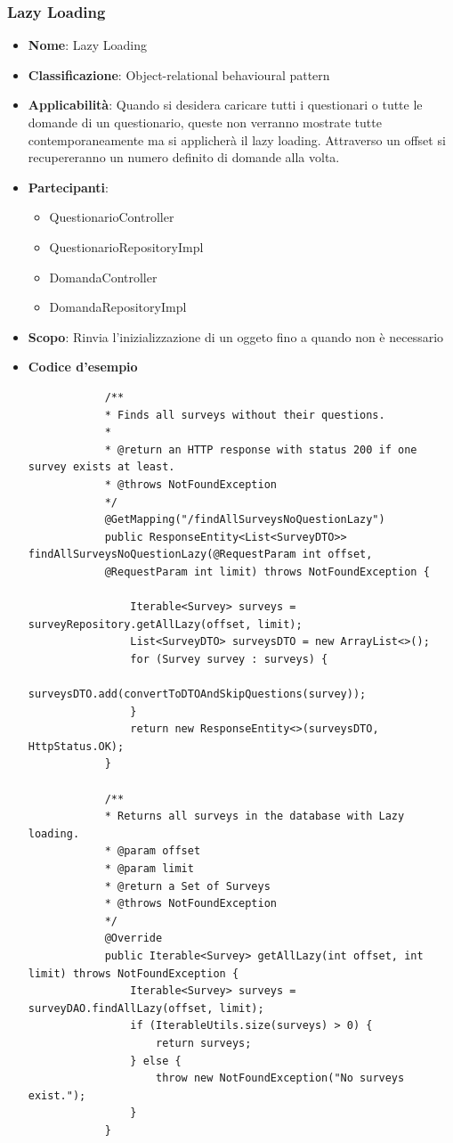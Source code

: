 \documentclass[12pt]{article}
\begin{document}
	\subsubsection{Lazy Loading}
	\begin{itemize}
		\item \textbf{Nome}: Lazy Loading
		\item \textbf{Classificazione}: Object-relational behavioural pattern
		\item \textbf{Applicabilità}: Quando si desidera caricare tutti i questionari o tutte le domande di un questionario, queste non verranno mostrate tutte contemporaneamente ma si applicherà il lazy loading. Attraverso un offset si recupereranno un numero definito di domande alla volta.
		\item \textbf{Partecipanti}:
		\begin{itemize}
			\item QuestionarioController
			\item QuestionarioRepositoryImpl
			\item DomandaController
			\item DomandaRepositoryImpl
		\end{itemize}
		\item \textbf{Scopo}: Rinvia l'inizializzazione di un oggeto fino a quando non è necessario
		\item \textbf{Codice d'esempio}
		\begin{lstlisting}
			/**
			* Finds all surveys without their questions.
			* 
			* @return an HTTP response with status 200 if one survey exists at least.
			* @throws NotFoundException
			*/
			@GetMapping("/findAllSurveysNoQuestionLazy")
			public ResponseEntity<List<SurveyDTO>> findAllSurveysNoQuestionLazy(@RequestParam int offset, 
			@RequestParam int limit) throws NotFoundException {
				
				Iterable<Survey> surveys = surveyRepository.getAllLazy(offset, limit);
				List<SurveyDTO> surveysDTO = new ArrayList<>();
				for (Survey survey : surveys) {
					surveysDTO.add(convertToDTOAndSkipQuestions(survey));
				}
				return new ResponseEntity<>(surveysDTO, HttpStatus.OK);
			}
			
			/**
			* Returns all surveys in the database with Lazy loading.
			* @param offset
			* @param limit
			* @return a Set of Surveys
			* @throws NotFoundException
			*/
			@Override
			public Iterable<Survey> getAllLazy(int offset, int limit) throws NotFoundException {
				Iterable<Survey> surveys = surveyDAO.findAllLazy(offset, limit);
				if (IterableUtils.size(surveys) > 0) {
					return surveys;
				} else {
					throw new NotFoundException("No surveys exist.");
				}
			}
		\end{lstlisting}
	\end{itemize}
	\newpage
\end{document}
